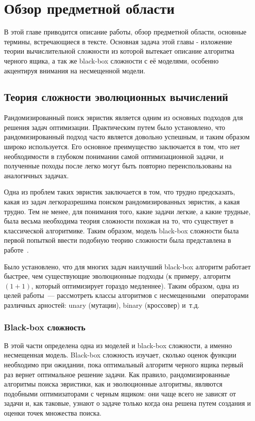 \chapter{Обзор предметной области}
\label{chapter1}

В этой главе приводится описание работы, обзор предметной области, основные термины, встречающиеся в тексте. Основная задача этой главы - изложение теории вычислительной сложности из которой вытекает описание алгоритма черного ящика, а так же black-box сложности с её моделями, особенно акцентируя внимания на несмещенной модели.

\section{Теория сложности эволюционных вычислений}
Рандомизированный поиск эвристик является одним из основных подходов для решения задач оптимизации. Практическим путем было установлено, что рандомизированный подход
часто является довольно успешным, и таким образом широко используется. Его основное преимущество заключается в том, что нет необходимости в глубоком понимании самой
оптимизационной задачи, и полученные походы после легко могут быть повторно переиспользованы на аналогичных задачах.

Одна из проблем таких эвристик заключается в том, что трудно предсказать, какая из задач легкоразрешима поиском рандомизированных эвристик, а какая трудно. Тем не менее, для понимания того, 
какие задачи легкие, а какие трудные, была весьма необходима теория сложности похожая на то, что существует в классической алгоритмике. Таким образом, модель black-box сложности была первой 
попыткой ввести подобную теорию сложности была представлена в работе~\cite{2}. 

Было установлено, что для многих задач наилучший black-box алгоритм работает быстрее, чем существующие эволюционные подходы (к примеру, алгоритм $(1+1)$, который оптимизирует гораздо медленнее). 
Таким образом, одна из целей работы~--- рассмотреть классы алгоритмов с несмещенными~\cite{6} операторами различных арностей: unary (мутации), binary (кроссовер) и~т.д.

\subsection{Black-box сложность}

В этой части определена одна из моделей и black-box сложности, а именно несмещенная модель.
Black-box сложность изучает, сколько оценок функции необходимо при ожидании, пока оптимальный алгоритм черного ящика первый раз вернет оптимальное решение задачи.
Как правило, рандомизированные алгоритмы поиска эвристики, как и эволюционные алгоритмы, являются подобными оптимизаторами с черным ящиком: они чаще всего не зависят
от задачи и, как таковые, узнают о задаче только когда она решена путем создания и оценки точек множества поиска.

